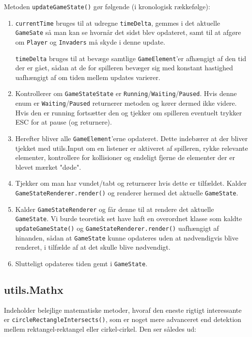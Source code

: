 \documentclass[titlepage,danish]{article}
\newcommand{\code}[1]{\texttt{#1}}
\begin{document}
Metoden \code{updateGameState()} gør følgende (i kronologisk rækkefølge):
\begin{enumerate}

\item \code{currentTime} bruges til at udregne \code{timeDelta}, gemmes i det aktuelle
  \code{GameSate} så man kan se hvornår det sidst blev opdateret, samt til at afgøre om
  \code{Player} og \code{Invaders} må skyde i denne update.

\code{timeDelta} bruges til at bevæge samtlige \code{GameElement}’er afhængigt af den tid der er gået, sådan at de for spilleren bevæger sig med konstant hastighed uafhængigt af om tiden mellem updates varierer.

\item Kontrollerer om \code{GameStateState} er \code{Running}/\code{Waiting}/\code{Paused}. Hvis denne enum er \code{Waiting}/\code{Paused} returnerer metoden og kører dermed ikke videre. Hvis den er running fortsætter den og tjekker om spilleren eventuelt trykker ESC for at pause (og returnere).

\item Herefter bliver alle \code{GameElement}’erne opdateret. Dette indebærer at der bliver tjekket med utils.Input om en listener er aktiveret af spilleren, rykke relevante elementer, kontrollere for kollisioner og endeligt fjerne de elementer der er blevet mærket "døde".

\item Tjekker om man har vundet/tabt og returnerer hvis dette er tilfældet. Kalder \code{GameStateRenderer.render()} og renderer hermed det aktuelle \code{GameState}.

\item Kalder \code{GameStateRenderer} og får denne til at rendere det aktuelle \code{GameState}. Vi burde teoretisk set  have haft en overordnet klasse som kaldte \code{updateGameState()} og \code{GameStateRenderer.render()} uafhængigt af hinanden, sådan at \code{GameState} kunne opdateres uden at nødvendigvis blive renderet, i tilfælde af at det skulle blive nødvendigt.

\item Slutteligt opdateres tiden gemt i \code{GameState}.
\end{enumerate}


\subsection{utils.Mathx}
Indeholder belejlige matematiske metoder, hvoraf den eneste rigtigt interessante er
\code{circleRectangleIntersects()}, som er noget mere advanceret end detektion mellem
rektangel-rektangel eller cirkel-cirkel. Den ser således ud:
\end{document}

